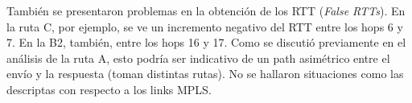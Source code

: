 También se presentaron problemas en la obtención de los RTT (\emph{False RTTs}). En la ruta C, por ejemplo, se ve un incremento negativo del RTT entre los hops 6 y 7. En la B2, también, entre los hops 16 y 17. Como se discutió previamente en el análisis de la ruta A, esto podría ser indicativo de un path asimétrico entre el envío y la respuesta (toman distintas rutas). No se hallaron situaciones como las descriptas con respecto a los links MPLS.


